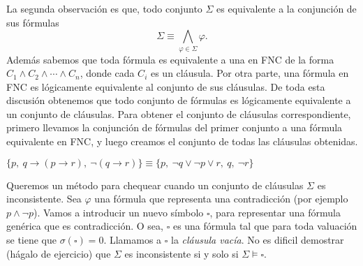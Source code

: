 La segunda observaci\'on es que, todo conjunto $\Sigma$ es equivalente a la conjunci\'on de sus f\'ormulas
\[
\Sigma \equiv \bigwedge_{\varphi \in \Sigma}\varphi.
\]
Adem\'as sabemos que toda f\'ormula es equivalente a una en FNC de la forma $C_1\wedge C_2\wedge \cdots \wedge C_n$,
donde cada $C_i$ es un cl\'ausula.
Por otra parte, una f\'ormula en FNC es l\'ogicamente equivalente al conjunto de sus cl\'ausulas.
De toda esta discusi\'on obtenemos que todo conjunto de f\'ormulas es l\'ogicamente equivalente a un
conjunto de cl\'ausulas.
Para obtener el conjunto de cl\'ausulas correspondiente, primero llevamos la conjunci\'on de
f\'ormulas del primer conjunto a una f\'ormula equivalente en FNC, y luego creamos el conjunto
de todas las cl\'ausulas obtenidas.

\begin{ejemplo}
$\{p,\ q\to (p\to r),\ \neg(q\to r)\} \equiv \{p,\ \neg q\vee \neg p\vee r,\ q,\ \neg r\}$
\end{ejemplo}

Queremos un m\'etodo para chequear cuando un conjunto de cl\'ausulas $\Sigma$ es inconsistente.
Sea $\varphi$ una f\'ormula que representa una contradicci\'on (por ejemplo $p\wedge \neg p$).
Vamos a introducir un nuevo s\'{i}mbolo $\square$, para representar una f\'ormula gen\'erica que es contradicci\'on.
O sea, $\square$ es una f\'ormula tal que para toda valuaci\'on se tiene que $\sigma(\square)=0$.
Llamamos a $\square$ la {\em cl\'ausula vac\'{i}a}.
No es dificil demostrar (h\'agalo de ejercicio) que $\Sigma$ es inconsistente si y solo si
$\Sigma\models \square$.

